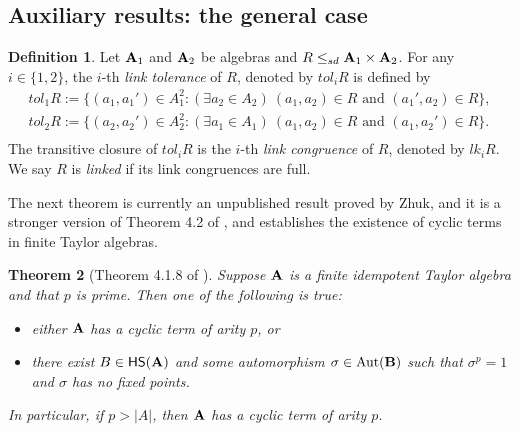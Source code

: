 \documentclass[11pt]{amsart}
\newcommand{\m}[1]{\mathbf{\uppercase{#1}}}
\newtheorem{thm}{Theorem}
\theoremstyle{definition}
\newtheorem{dfn}[thm]{Definition}
\theoremstyle{remark}
\theoremstyle{plain}
\begin{document}

\subsection{Auxiliary results: the general case}

\begin{dfn}\label{linkdef}
Let ${\m A}_1$ and ${\m A}_2$ be algebras and $R \leq_{sd}{\m A}_1 \times {\m A}_2$. For any $i\in \{1,2\}$, the $i$-th {\em link tolerance} of $R$, denoted by $tol_i R$ is defined by
\[
\begin{gathered}
tol_1 R:=\{(a_1,a_1')\in A_1^2:(\exists a_2\in A_2)\
(a_1,a_2)\in R\text{ and }(a_1',a_2)\in R\},\\
tol_2 R:=\{(a_2,a_2')\in A_2^2:(\exists a_1\in A_1)\
(a_1,a_2)\in R\text{ and }(a_1,a_2')\in R\}.\\
\end{gathered}
\]
The transitive closure of $tol_iR$ is the $i$-th {\em link congruence} of $R$, denoted by $lk_iR$. We say $R$ is {\em linked} if its link congruences are full.
\end{dfn}

The next theorem is currently an unpublished result proved by Zhuk, and it is a stronger version of Theorem 4.2 of \cite{BartoKozik}, and establishes the existence of cyclic terms in finite Taylor algebras.

\begin{thm}[Theorem 4.1.8 of \cite{Zebnotes}]\label{cyclic}
Suppose ${\m A}$ is a finite idempotent Taylor algebra and that $p$ is prime. Then one of the following is true:
\begin{itemize}
\item[$\mathrm{(1)}$] either ${\m A}$ has a cyclic term of arity $p$, or
\item[$\mathrm{(2)}$] there exist $B\in \mathsf{HS}({\m A})$ and some automorphism $\sigma\in \mathrm{Aut}({\m B})$ such that $\sigma ^p =1$ and $\sigma$ has no fixed points.
\end{itemize}
In particular, if $p>|A|$, then ${\m A}$ has a cyclic term of arity $p$.
\end{thm}
\end{document}

